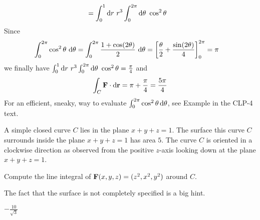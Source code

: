 \begin{solution}
\begin{align*}
&=\int_0^1 \mathrm{d}r\ r^3\int_0^{2\pi}\mathrm{d}\theta\ \cos^2\theta
\end{align*}
Since \begin{align*}
\int_0^{2\pi}\cos^2\theta\ \mathrm{d}\theta
&=\int_0^{2\pi}\frac{1+\cos(2\theta)}{2}\ \mathrm{d}\theta
=\left[\frac{\theta}{2}+\frac{\sin(2\theta)}{4}\right]_0^{2\pi}
=\pi
\end{align*}
we finally have
$\int_0^1 \dee{r}\ r^3\int_0^{2\pi}\dee{\theta}\ \cos^2\theta=\frac{\pi}{4}$
and
\begin{equation*}
\int_C \mathbf{F}\cdot\mathrm{d}\mathbf{r}
=\pi+\frac{\pi}{4}
=\frac{5\pi}{4}
\end{equation*}
For an efficient, sneaky, way to evaluate 
$\int_0^{2\pi} \cos^2\theta\,\mathrm{d}\theta$,
see Example  in the CLP-4 text.
\end{solution}

\begin{question}[M317 2008D] %
A simple closed curve $C$ lies in the plane $x + y + z = 1$. 
The surface this curve $C$ surrounds inside the plane $x + y + z = 1$
has area $5$. The curve $C$ is oriented in a clockwise direction as 
observed from the positive $z$-axis looking down at the plane
$x + y + z = 1$.

Compute the line integral of $\mathbf{F} (x, y, z) = (z^2 , x^2 , y^2)$ around $C$.
\end{question}

\begin{hint} 
The fact that the surface is not completely specified is a big hint.
\end{hint}

\begin{answer} 
$-\frac{10}{\sqrt{3}}$
\end{answer}


